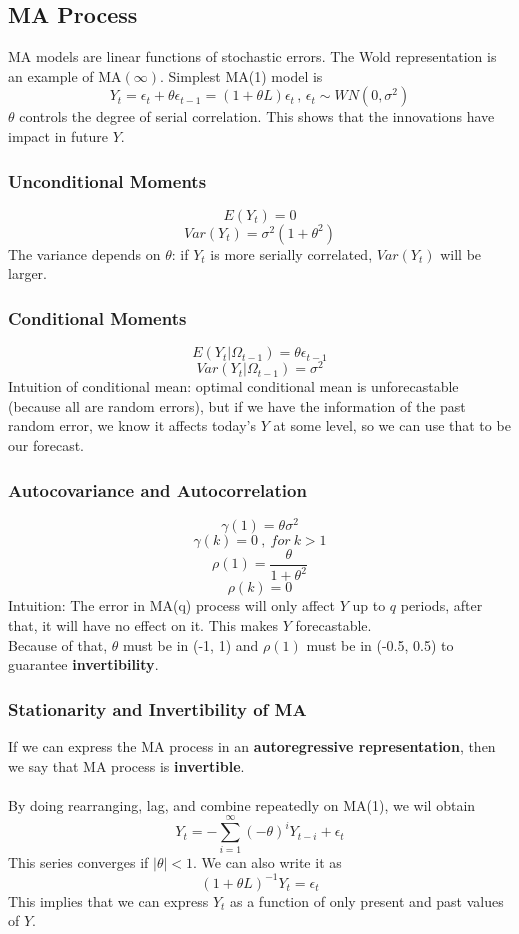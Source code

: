 \documentclass{article}
\begin{document}
\subsection{MA Process}
MA models are linear functions of stochastic errors. The Wold representation is an example of MA$(\infty)$. Simplest MA(1) model is 
$$Y_t = \epsilon_t + \theta \epsilon_{t-1} = (1+\theta L)\epsilon_t \, , \, \epsilon_t \sim WN(0, \sigma^2)$$
$\theta$ controls the degree of serial correlation. This shows that the innovations have impact in future $Y$.

\subsubsection{Unconditional Moments}
$$E(Y_t) = 0$$
$$Var(Y_t) = \sigma^2(1+\theta^2)$$
The variance depends on $\theta$: if $Y_t$ is more serially correlated, $Var(Y_t)$ will be larger.

\subsubsection{Conditional Moments}
$$E(Y_t|\Omega_{t-1}) = \theta \epsilon_{t-1}$$
$$Var(Y_t|\Omega_{t-1}) = \sigma^2$$
Intuition of conditional mean: optimal conditional mean is unforecastable (because all are random errors), but if we have the information of the past random error, we know it affects today's $Y$ at some level, so we can use that to be our forecast.  

\subsubsection{Autocovariance and Autocorrelation}
$$\gamma(1) = \theta \sigma^2$$
$$\gamma(k) = 0 \ , \ for \ k>1$$
$$\rho(1) = \frac{\theta}{1+\theta^2}$$
$$\rho(k) = 0$$
Intuition: The error in MA(q) process will only affect $Y$ up to $q$ periods, after that, it will have no effect on it. This makes $Y$ forecastable.\\
Because of that, $\theta$ must be in (-1, 1) and $\rho(1)$ must be in (-0.5, 0.5) to guarantee \textbf{invertibility}.

\subsubsection{Stationarity and Invertibility of MA}
If we can express the MA process in an \textbf{autoregressive representation}, then we say that MA process is \textbf{invertible}.\\
\\
By doing rearranging, lag, and combine repeatedly on MA(1), we wil obtain
$$Y_t = -\sum_{i=1}^\infty (-\theta)^i Y_{t-i} + \epsilon_t$$
This series converges if $|\theta| < 1$. We can also write it as
$$(1+\theta L)^{-1}Y_t = \epsilon_t$$
This implies that we can express $Y_t$ as a function of only present and past values of $Y$.\\
\end{document}
